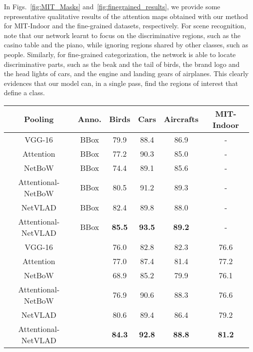 \documentclass{bmvc2k}
\newcommand{\MS}[1]{{\color{blue}{\bf #1}}}
\newcommand{\KN}[1]{{\color{red}{\bf #1}}}
\newcommand{\MS}[1]{}
\newcommand{\KN}[1]{}
\begin{document}
In Figs.~\ref{fig:MIT_Masks} and~\ref{fig:finegrained_results}, we provide some representative qualitative results of the attention maps obtained with our method for MIT-Indoor and the fine-grained datasets, respectively. For scene recognition, note that our network learnt to focus on the discriminative regions, such as the casino table and the piano, while ignoring regions shared by other classes, such as people. Similarly, for fine-grained categorization, the network is able to locate discriminative parts, such as the beak and the tail of birds, the brand logo and the head lights of cars, and the engine and landing gears of airplanes. This clearly evidences that our model can, in a single pass, find the regions of interest that define a class. 
	\small
	\centering
	\begin{tabular}{|c|c|c|c|c|c|}
		\hline
		Pooling             & Anno.      & Birds & Cars & Aircrafts& MIT-Indoor\\
		\hline
		VGG-16                  & BBox       & 79.9 & 88.4 & 86.9 & -  \\         
		Attention           & BBox       & 77.2 & 90.3 & 85.0 & -  \\   
		NetBoW              & BBox       & 74.4 & 89.1 & 85.6 & -  \\     
		Attentional-NetBoW  & BBox       & 80.5 & 91.2 & 89.3 & -  \\     
		NetVLAD             & BBox       & 82.4 & 89.8 & 88.0 & -  \\     
		Attentional-NetVLAD & BBox       & \textbf{85.5} & \textbf{93.5} & \textbf{89.2}    & - \\
		\hline
		VGG-16                  &            & 76.0 & 82.8 & 82.3    & 76.6 \\         
		Attention           &            & 77.0 & 87.4 & 81.4    & 77.2 \\   
		NetBoW              &            & 68.9 & 85.2 & 79.9  & 76.1 \\     
		Attentional-NetBoW  &            & 76.9 & 90.6 & 88.3  & 76.6 \\     
		NetVLAD             &            & 80.6 & 89.4 & 86.4  & 79.2 \\     
		Attentional-NetVLAD &            &  \textbf{84.3} & \textbf{92.8} & \textbf{88.8} & \textbf{81.2}\\   	
		\hline
		
	\end{tabular}
\end{document}
